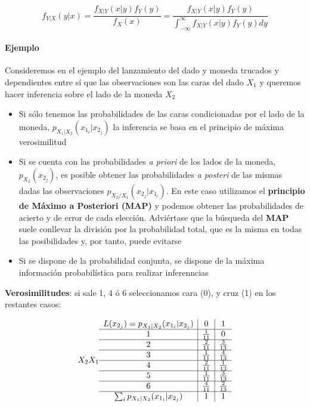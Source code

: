 \documentclass[11pt]{article}
\providecommand{\tightlist}{%
      \setlength{\itemsep}{0pt}\setlength{\parskip}{0pt}}
\begin{document}
\[f_{Y | X}(y | x) = \frac{f_{X | Y}(x | y)f_Y(y)}{f_X(x)}=\frac{f_{X | Y}(x | y)f_Y(y)}{\int_{-\infty}^\infty f_{X | Y}(x | y)f_{Y}(y)dy}\]

    \hypertarget{ejemplo}{%
\paragraph{Ejemplo}\label{ejemplo}}

Consideremos en el ejemplo del lanzamiento del dado y moneda trucados y
dependientes entre sí que las observaciones son las caras del dado
\(X_1\) y queremos hacer inferencia sobre el lado de la moneda \(X_2\)

\begin{itemize}
\tightlist
\item
  Si sólo tenemos las probabilidades de las caras condicionadas por el
  lado de la moneda, \(p_{X_1 | X_2}(x_{1_i} | x_{2_j})\) la inferencia
  se basa en el principio de máxima verosimilitud
\item
  Si se cuenta con las probabilidades \emph{a priori} de los lados de la
  moneda, \(p_{X_2}(x_{2_j})\), es posible obtener las probabilidades
  \emph{a posteri} de las mismas dadas las observaciones
  \(p_{X_2/X_1}(x_{2_j} | x_{1_i})\). En este caso utilizamos el
  \textbf{principio de Máximo a Posteriori (MAP)} y podemos obtener las
  probabilidades de acierto y de error de cada elección. Adviértase que
  la búsqueda del \textbf{MAP} suele conllevar la división por la
  probabilidad total, que es la misma en todas las posibilidades y, por
  tanto, puede evitarse
\item
  Si se dispone de la probabilidad conjunta, se dispone de la máxima
  información probabilística para realizar inferenncias
\end{itemize}

    \textbf{Verosimilitudes}: si sale 1, 4 ó 6 seleccionamos cara (0), y
cruz (1) en los restantes casos:

\[
X_2 \\X_1 \begin{array}{c|c|c}
L(x_{2_j}) = p_{X_1 | X_2}(x_{1_i} | x_{2_j}) & 0 & 1\\
\hline
1 & \frac{1}{11} & 0\\
\hline
2 & \frac{2}{11} & \frac{3}{13}\\
\hline
3 & \frac{1}{11} & \frac{4}{13}\\
\hline
4 & \frac{2}{11} & \frac{1}{13}\\
\hline
5 & \frac{1}{11} & \frac{3}{13}\\
\hline
6 & \frac{4}{11} & \frac{2}{13}\\
\hline
\sum_i p_{X_1 | X_2}(x_{1_i} | x_{2_j}) & 1 & 1 
\end{array}
\]
\end{document}
